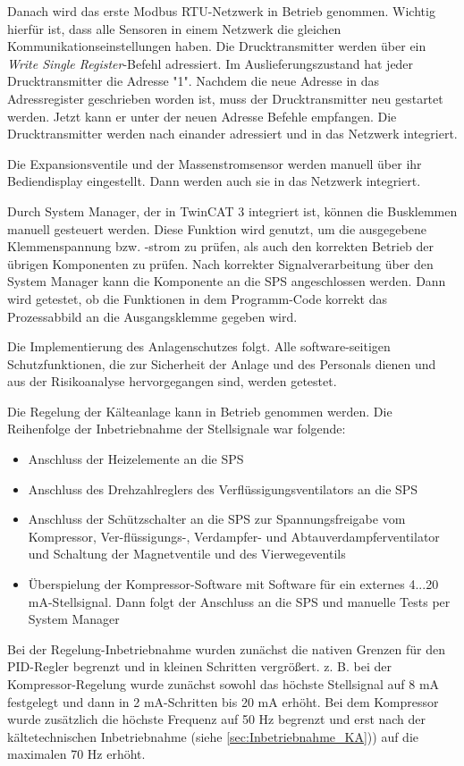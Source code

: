 Danach wird das erste Modbus RTU-Netzwerk in Betrieb genommen. Wichtig hierfür ist, dass alle Sensoren in einem Netzwerk die gleichen Kommunikationseinstellungen haben. Die Drucktransmitter werden über ein \textit{Write Single Register}-Befehl adressiert. Im Auslieferungszustand hat jeder Drucktransmitter die Adresse "1". Nachdem die neue Adresse in das Adressregister geschrieben worden ist, muss der Drucktransmitter neu gestartet werden. Jetzt kann er unter der neuen Adresse Befehle empfangen. 
Die Drucktransmitter werden nach einander adressiert und in das Netzwerk integriert. 

Die Expansionsventile und der Massenstromsensor werden manuell über ihr Bediendisplay eingestellt. Dann werden  auch sie in das Netzwerk integriert. 
 
Durch System Manager, der in TwinCAT 3 integriert ist,   können die Busklemmen manuell gesteuert werden. Diese Funktion wird genutzt, um die ausgegebene Klemmenspannung bzw. -strom zu prüfen, als auch den korrekten Betrieb der übrigen Komponenten zu prüfen. Nach korrekter Signalverarbeitung über den System Manager kann die Komponente an die SPS angeschlossen werden. Dann wird getestet, ob die Funktionen in dem Programm-Code korrekt das Prozessabbild an die Ausgangsklemme gegeben wird. 

Die Implementierung des Anlagenschutzes folgt. Alle software-seitigen Schutzfunktionen, die zur Sicherheit der Anlage und des Personals dienen und aus der Risikoanalyse hervorgegangen sind, werden getestet. 

Die Regelung der Kälteanlage kann in Betrieb genommen werden. Die Reihenfolge der Inbetriebnahme der Stellsignale war folgende:

\begin{itemize}
\item Anschluss der Heizelemente an die SPS 
\item Anschluss des Drehzahlreglers des Verflüssigungsventilators an die SPS 
\item Anschluss der Schützschalter an die SPS zur Spannungsfreigabe vom Kompressor, Ver-flüssigungs-, Verdampfer- und Abtauverdampferventilator und Schaltung der Magnetventile und des Vierwegeventils
\item Überspielung der Kompressor-Software mit Software für ein externes 4...20 mA-Stellsignal. Dann folgt der Anschluss an die SPS und manuelle Tests per System Manager
\end{itemize}

Bei der Regelung-Inbetriebnahme wurden zunächst die nativen Grenzen für den PID-Regler begrenzt und in kleinen Schritten vergrößert. z. B. bei der Kompressor-Regelung wurde zunächst sowohl das höchste Stellsignal auf 8 mA festgelegt und dann in 2 mA-Schritten bis 20 mA erhöht. Bei dem Kompressor wurde zusätzlich die höchste Frequenz auf 50 Hz begrenzt und erst nach der kältetechnischen Inbetriebnahme (siehe \ref{sec:Inbetriebnahme_KA})) auf die maximalen 70 Hz erhöht. 

